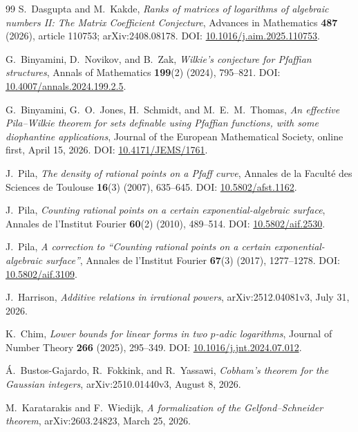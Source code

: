 \documentclass[11pt,oneside]{article}
\theoremstyle{definition}
\theoremstyle{remark}
\begin{document}
\begin{thebibliography}{99}
S.~Dasgupta and M.~Kakde,
\newblock \emph{Ranks of matrices of logarithms of algebraic numbers II: The Matrix
Coefficient Conjecture},
\newblock Advances in Mathematics \textbf{487} (2026), article 110753;
arXiv:2408.08178.
\newblock DOI: \href{https://doi.org/10.1016/j.aim.2025.110753}{10.1016/j.aim.2025.110753}.

G.~Binyamini, D.~Novikov, and B.~Zak,
\newblock \emph{Wilkie's conjecture for Pfaffian structures},
\newblock Annals of Mathematics \textbf{199}(2) (2024), 795--821.
\newblock DOI: \href{https://doi.org/10.4007/annals.2024.199.2.5}{10.4007/annals.2024.199.2.5}.

G.~Binyamini, G.~O.~Jones, H.~Schmidt, and M.~E.~M.~Thomas,
\newblock \emph{An effective Pila--Wilkie theorem for sets definable using Pfaffian
functions, with some diophantine applications},
\newblock Journal of the European Mathematical Society, online first, April 15, 2026.
\newblock DOI: \href{https://doi.org/10.4171/JEMS/1761}{10.4171/JEMS/1761}.

J.~Pila,
\newblock \emph{The density of rational points on a Pfaff curve},
\newblock Annales de la Facult\'e des Sciences de Toulouse \textbf{16}(3) (2007), 635--645.
\newblock DOI: \href{https://doi.org/10.5802/afst.1162}{10.5802/afst.1162}.

J.~Pila,
\newblock \emph{Counting rational points on a certain exponential-algebraic surface},
\newblock Annales de l'Institut Fourier \textbf{60}(2) (2010), 489--514.
\newblock DOI: \href{https://doi.org/10.5802/aif.2530}{10.5802/aif.2530}.

J.~Pila,
\newblock \emph{A correction to ``Counting rational points on a certain
exponential-algebraic surface''},
\newblock Annales de l'Institut Fourier \textbf{67}(3) (2017), 1277--1278.
\newblock DOI: \href{https://doi.org/10.5802/aif.3109}{10.5802/aif.3109}.

J.~Harrison,
\newblock \emph{Additive relations in irrational powers},
\newblock arXiv:2512.04081v3, July 31, 2026.

K.~Chim,
\newblock \emph{Lower bounds for linear forms in two $p$-adic logarithms},
\newblock Journal of Number Theory \textbf{266} (2025), 295--349.
\newblock DOI: \href{https://doi.org/10.1016/j.jnt.2024.07.012}{10.1016/j.jnt.2024.07.012}.

\'A.~Bustos-Gajardo, R.~Fokkink, and R.~Yassawi,
\newblock \emph{Cobham's theorem for the Gaussian integers},
\newblock arXiv:2510.01440v3, August 8, 2026.

M.~Karatarakis and F.~Wiedijk,
\newblock \emph{A formalization of the Gelfond--Schneider theorem},
\newblock arXiv:2603.24823, March 25, 2026.

\end{thebibliography}
\end{document}

